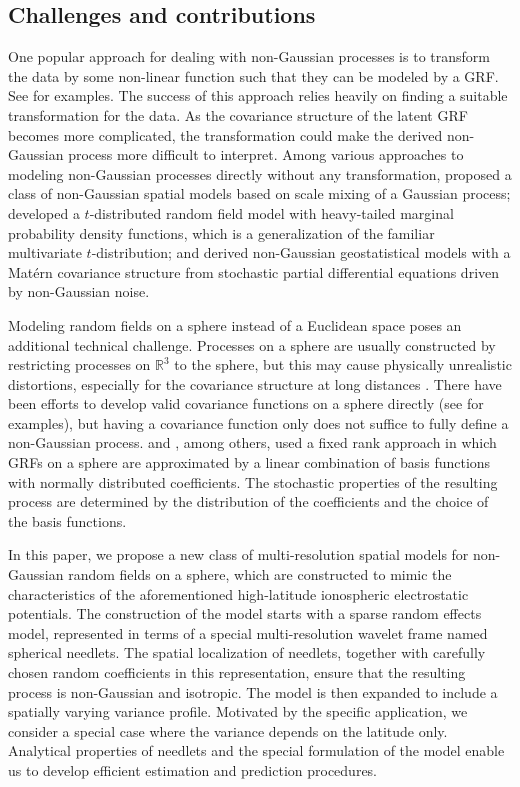 \documentclass[aoas,preprint]{imsart}
\numberwithin{equation}{section}
\theoremstyle{plain}
\begin{document}
\subsection{Challenges and contributions}
One popular approach for dealing with non-Gaussian processes is to transform the data by some non-linear function such that they can be modeled by a GRF. See \citet{Cressie-93, De-97, Xu-16} for examples. The success of this approach relies heavily on finding a suitable transformation for the data. As the covariance structure of the latent GRF becomes more complicated, the transformation could make the derived non-Gaussian process more difficult to interpret.  Among various approaches to modeling non-Gaussian processes directly without any transformation, \citet{Palacios-06} proposed a class of non-Gaussian spatial models based on scale mixing of a Gaussian process; \citet{Roislien-06} developed a $t$-distributed random field model with heavy-tailed marginal probability density functions, which is a generalization of the familiar multivariate $t$-distribution; and \citet{Wallin-15} derived non-Gaussian geostatistical models with a Mat\'ern covariance structure from stochastic partial differential equations driven by non-Gaussian noise.

Modeling random fields on a sphere instead of a Euclidean space poses an additional technical challenge. Processes on a sphere are usually constructed by restricting processes on $\mathbb{R}^3$ to the sphere, but this may cause physically unrealistic distortions, especially for the covariance structure at long distances \citep{Gneiting-13}.
There have been efforts to develop valid covariance functions on a sphere directly (see \citet{Jun-08, Guinness-16} for examples), but having a covariance function only does not suffice to fully define a non-Gaussian process. \citet{Stein-07} and  \citet{Cressie-08}, among others, used a fixed rank approach in which GRFs on a sphere are approximated by a linear combination of basis functions with normally distributed coefficients. The stochastic properties of the resulting process are determined by the distribution of the coefficients and the choice of the basis functions.


In this paper, we propose a new class of multi-resolution spatial models for non-Gaussian random fields on a sphere, which are constructed to mimic the characteristics of the aforementioned  high-latitude ionospheric electrostatic potentials. 
The construction of the model starts with a sparse random effects model, represented in terms of a special multi-resolution wavelet frame named spherical needlets. The spatial localization of needlets, together with carefully chosen random coefficients in this representation, ensure that the resulting process is non-Gaussian and isotropic. The model is then expanded to include a spatially varying variance profile. Motivated by the specific application, we consider a special case where the variance depends on the latitude only. Analytical properties of needlets and the special formulation of the model enable us to develop efficient estimation and prediction procedures. 
\end{document}
